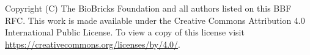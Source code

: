 

Copyright (C) The BioBricks Foundation and all authors listed on this BBF RFC. This work is made available under the Creative Commons Attribution 4.0 International Public License. To view a copy of this license visit \href{https://creativecommons.org/licenses/by/4.0/}{https://creativecommons.org/licenses/by/4.0/}.

